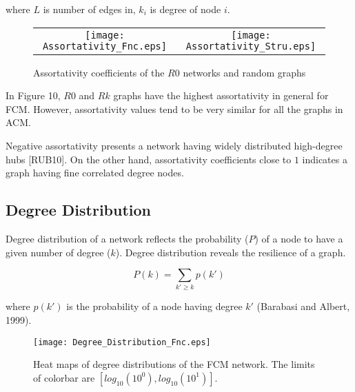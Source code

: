 \documentclass[12pt]{article}
\begin{document}
where $L$ is number of edges in, $k_i$ is degree of node $i$.


\begin{figure}[htp]

  \centering

    \begin{tabular}{cc}


    \texttt{[image: Assortativity\_Fnc.eps]} &

    \texttt{[image: Assortativity\_Stru.eps]}\\

  \end{tabular}

 \label{figur}\caption{Assortativity coefficients of the $R0$ networks and random graphs}
 
\end{figure}

In Figure 10, $R0$ and $Rk$ graphs have the highest assortativity in general for FCM. However, assortativity values tend to be very similar for all the graphs in ACM. 

Negative assortativity presents a network having widely distributed high-degree hubs [RUB10]. On the other hand, assortativity coefficients close to $1$ indicates a graph having fine correlated degree nodes. 

\newpage

\subsection{Degree Distribution}
Degree distribution of a network reflects the probability ($P$) of a node to have a given number of degree ($k$). Degree distribution reveals the resilience of a graph. 

\begin{equation}
 P(k) = \sum\limits_{k' \geq k} p(k')
\end{equation}

where $p(k')$ is the probability of a node having degree $k'$ (Barabasi and Albert, 1999). 

\begin{figure}[htp!]
	\centering
	\texttt{[image: Degree\_Distribution\_Fnc.eps]}
	\caption{Heat maps of degree distributions of the FCM network. The limits of colorbar are $[log_{10}(10^0), log_{10}(10^1)]$.}
\end{figure}
\end{document}
